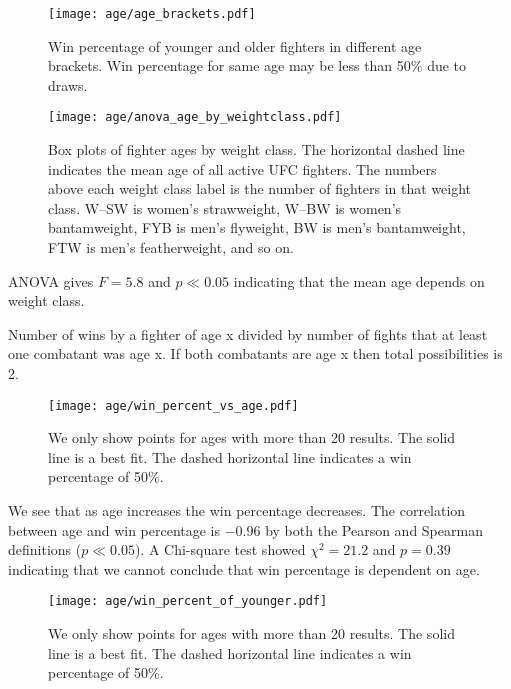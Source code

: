 \begin{figure}[h]
\begin{center}
\texttt{[image: age/age\_brackets.pdf]}
\caption{Win percentage of younger and older fighters
in different age brackets. Win percentage for same
age may be less than 50\% due to draws.}
\label{age_brackets}
\end{center}
\end{figure}

\begin{figure}[h]
\begin{center}
\texttt{[image: age/anova\_age\_by\_weightclass.pdf]}
\caption{Box plots of fighter ages by weight class. The horizontal dashed
line indicates the mean age of all active UFC fighters. The
numbers above each weight class label is the number of fighters
in that weight class. W--SW is women's strawweight, W--BW is women's
bantamweight, FYB is men's flyweight, BW is men's bantamweight, FTW
is men's featherweight, and so on.}
\end{center}
\end{figure}

ANOVA gives $F=5.8$ and $p \ll 0.05$ indicating that the mean age depends on weight class.

Number of wins by a fighter of age x divided by number of
fights that at least one combatant was age x. If both
combatants are age x then total possibilities is 2.

\clearpage

\begin{figure}[h]
\begin{center}
\texttt{[image: age/win\_percent\_vs\_age.pdf]}
\caption{We only show points for ages with more than 20 results. The
solid line is a best fit. The dashed horizontal line indicates
a win percentage of 50\%.}
\end{center}
\end{figure}

We see that as age increases the win percentage decreases. The
correlation between age and win percentage is $-0.96$ by both
the Pearson and Spearman definitions ($p \ll 0.05$). A Chi-square
test showed $\chi^2=21.2$ and $p=0.39$ indicating that we cannot
conclude that win percentage is dependent on age.

\begin{figure}[h]
\begin{center}
\texttt{[image: age/win\_percent\_of\_younger.pdf]}
\caption{We only show points for ages with more than 20 results. The
solid line is a best fit. The dashed horizontal line indicates
a win percentage of 50\%.}
\end{center}
\end{figure}

